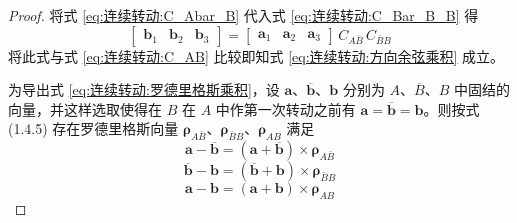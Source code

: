 \begin{proof}
    将式 \eqref{eq:连续转动:C_Abar_B} 代入式 \eqref{eq:连续转动:C_Bar_B_B} 得
$$
\begin{bmatrix}\mathbf{b}_1 & \mathbf{b}_2 & \mathbf{b}_3\end{bmatrix}
=\begin{bmatrix}\mathbf{a}_1 & \mathbf{a}_2 & \mathbf{a}_3\end{bmatrix}\,C_{A\bar B}\,C_{\bar B B}
$$
将此式与式 \eqref{eq:连续转动:C_AB} 比较即知式 \eqref{eq:连续转动:方向余弦乘积} 成立。

为导出式 \eqref{eq:连续转动:罗德里格斯乘积}，设 $\mathbf{a}$、$\overline{\mathbf{b}}$、$\mathbf{b}$ 分别为 $A$、$\overline{B}$、$B$ 中固结的向量，并这样选取使得在 $B$ 在 $A$ 中作第一次转动之前有 $\mathbf{a}=\overline{\mathbf{b}}=\mathbf{b}$。则按式 (1.4.5) 存在罗德里格斯向量 $\boldsymbol{\rho}_{A\bar B}$、$\boldsymbol{\rho}_{\bar B B}$、$\boldsymbol{\rho}_{AB}$ 满足
\begin{equation}\label{eq:连续转动:罗德里格斯Abar_B}
\mathbf{a}-\overline{\mathbf{b}}=(\mathbf{a}+\overline{\mathbf{b}})\times\boldsymbol{\rho}_{A\bar B}
\end{equation}
\begin{equation}\label{eq:连续转动:罗德里格斯Bar_B_B}
\overline{\mathbf{b}}-\mathbf{b}=(\overline{\mathbf{b}}+\mathbf{b})\times\boldsymbol{\rho}_{\bar B B}
\end{equation}
\begin{equation}\label{eq:连续转动:罗德里格斯AB}
\mathbf{a}-\mathbf{b}=(\mathbf{a}+\mathbf{b})\times\boldsymbol{\rho}_{AB}
\end{equation}


\end{proof}
